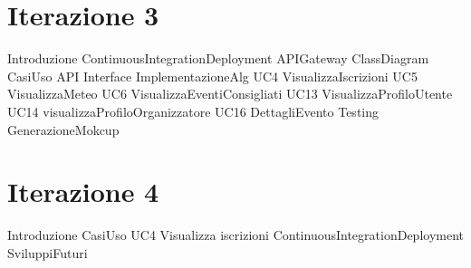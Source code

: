 \documentclass[a4paper, 12pt]{book}
\begin{document}
\chapter{Iterazione 3}
{Introduzione}
\clearpage
{ContinuousIntegrationDeployment}
\clearpage
{APIGateway}
\clearpage
{ClassDiagram}
\clearpage
{CasiUso}
\clearpage
{API}
\clearpage
{Interface}
\clearpage
{ImplementazioneAlg}
\clearpage
{UC4 VisualizzaIscrizioni}
\clearpage
{UC5 VisualizzaMeteo}
\clearpage
{UC6 VisualizzaEventiConsigliati}
\clearpage
{UC13 VisualizzaProfiloUtente}
\clearpage
{UC14 visualizzaProfiloOrganizzatore}
\clearpage
{UC16 DettagliEvento}
\clearpage
{Testing}
\clearpage
{GenerazioneMokcup}
\clearpage 


\chapter{Iterazione 4}
{Introduzione}
\clearpage
{CasiUso}
\clearpage
{UC4 Visualizza iscrizioni}
\clearpage
{ContinuousIntegrationDeployment}
\clearpage
{SviluppiFuturi}
\clearpage
\end{document}
